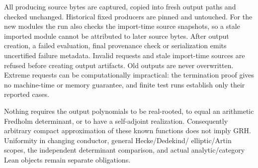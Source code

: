 All producing source bytes are captured, copied into fresh output paths and
checked unchanged. Historical fixed producers are pinned and untouched.
For the new modules the run also checks the import-time source snapshots,
so a stale imported module cannot be attributed to later source bytes.
After output creation, a failed evaluation, final provenance check or
serialization emits uncertified failure metadata. Invalid requests and stale
import-time sources are refused before creating output artifacts. Old
outputs are never overwritten. Extreme requests can be
computationally impractical: the termination proof gives no machine-time or
memory guarantee, and finite test runs establish only their reported cases.

Nothing requires the output polynomials to be real-rooted, to equal an
arithmetic Fredholm determinant, or to have a self-adjoint realization.
Consequently arbitrary compact approximation of these known functions does
not imply GRH. Uniformity in changing conductor, general Hecke/Dedekind/
elliptic/Artin scopes, the independent determinant comparison, and actual
analytic/category Lean objects remain separate obligations.
